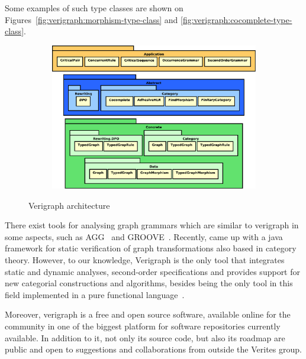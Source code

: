 Some examples of such type classes are shown on
Figures~\ref{fig:verigraph:morphism-type-class} and \ref{fig:verigraph:cocomplete-type-class}.

\begin{figure}[!ht]
  \centering
  \begin{subfigure}[t]{.5\textwidth}
    \centerline{\includegraphics[scale=0.5]{images/verigraph/layers}}
  \end{subfigure}
  \caption{Verigraph architecture}\label{fig:verigraph:layers}
\end{figure}
There exist tools for analysing graph grammars which are similar to verigraph in some aspects, such as AGG~\cite{Taentzer2000} and GROOVE~\cite{Rensink2004}. Recently, \cite{Deckwerth2016} came up with a java framework for static verification of graph transformations also based in category theory.  However, to our knowledge, Verigraph is the only tool that integrates static and dynamic analyses, second-order specifications and provides support for new categorial constructions and algorithms, besides being the only tool in this field implemented in a pure functional language~\cite{Costa2016}.

Moreover, verigraph is a free and open source software, available online for the community in one of the biggest platform for software repositories currently available. In addition to it, not only its source code, but also its roadmap are public and open to suggestions and collaborations from outside the Verites group.

